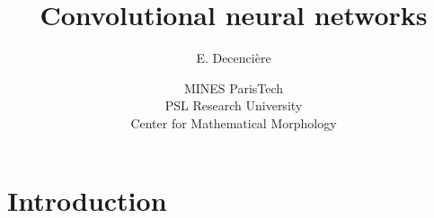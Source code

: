 \documentclass[xcolor=pdftex,dvipsnames,table,mathserif]{beamer}
\title{Convolutional neural networks}
\author{E. Decencière}
\date{MINES ParisTech\\
  PSL Research University\\
  Center for Mathematical Morphology
}
\begin{document}
\begin{frame}
  \titlepage
\end{frame}






\section{Introduction}
\end{document}
